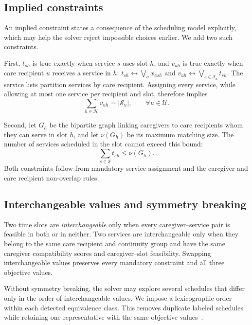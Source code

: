\documentclass[sigconf,nonacm]{acmart}
\begin{document}
\subsection{Implied constraints}

An implied constraint states a consequence of the scheduling model explicitly,
which may help the solver reject impossible choices earlier.  We add two such
constraints.

First, $t_{sh}$ is true exactly when service $s$ uses slot $h$, and $v_{uh}$ is
true exactly when care recipient $u$ receives a service in $h$:
$t_{sh}\leftrightarrow\bigvee_a x_{ash}$ and
$v_{uh}\leftrightarrow\bigvee_{s\in\mathcal S_u}t_{sh}$.  The service lists
partition services by care recipient.  Assigning every service, while allowing
at most one service per recipient and slot, therefore implies
\begin{equation}
  \sum_{h\in\mathcal H}v_{uh}=|\mathcal S_u|,
  \qquad \forall u\in\mathcal U.
\end{equation}

Second, let $G_h$ be the bipartite graph linking caregivers to care recipients
whom they can serve in slot $h$, and let $\nu(G_h)$ be its maximum matching
size.  The number of services scheduled in the slot cannot exceed this bound:
\begin{equation}
  \sum_{s\in\mathcal S}t_{sh}\le \nu(G_h).
\end{equation}
Both constraints follow from mandatory service assignment and the caregiver and
care recipient non-overlap rules.

\subsection{Interchangeable values and symmetry breaking}

Two time slots are \emph{interchangeable} only when every caregiver--service
pair is feasible in both or in neither.  Two services are interchangeable only
when they belong to the same care recipient and continuity group and have the
same caregiver compatibility scores and caregiver--slot feasibility.  Swapping
interchangeable values preserves every mandatory constraint and all three
objective values.

Without symmetry breaking, the solver may explore several schedules that differ
only in the order of interchangeable values.  We impose a lexicographic order
within each detected equivalence class.  This removes duplicate labeled
schedules while retaining one representative with the same objective
values~\cite{BogaertsEtAl2022}.
\end{document}
